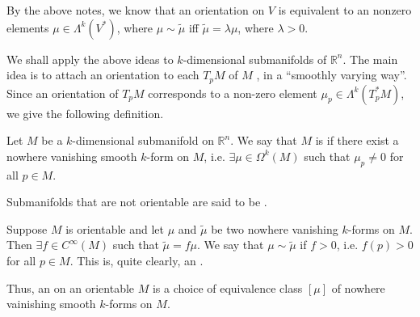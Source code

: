 \documentclass[notoc,notitlepage]{tufte-book}
\begin{document}
By the above notes, we know that an orientation on $V$ is equivalent to an
nonzero elements $\mu \in \Lambda^k(V^*)$, where $\mu \sim \tilde{\mu}$ iff
$\tilde{\mu} = \lambda \mu$, where $\lambda > 0$.

We shall apply the above ideas to $k$-dimensional submanifolds of
$\mathbb{R}^n$. The main idea is to attach an orientation to each
 $T_p M$ of $M$ , in a
``smoothly varying way''. Since an orientation of $T_p M$ corresponds to a
non-zero element $\mu_p \in \Lambda^k(T_p^* M)$, we give the following
definition.

\begin{defn}\label{defn:orientable_submanifolds}
  Let $M$ be a $k$-dimensional submanifold on $\mathbb{R}^n$. We say that $M$ is
   if there exist a nowhere vanishing smooth $k$-form on
  $M$, i.e. $\exists \mu \in \Omega^k(M)$ such that $\mu_p \neq 0$ for all $p
  \in M$.

  Submanifolds that are not orientable are said to be .
\end{defn}

\begin{note}
  Suppose $M$ is orientable and let $\mu$ and $\tilde{\mu}$ be two nowhere
  vanishing $k$-forms on $M$. Then $\exists f \in C^\infty(M)$ such that
  $\tilde{\mu} = f \mu$. We say that $\mu \sim \tilde{\mu}$ if $f > 0$, i.e.
  $f(p) > 0$ for all $p \in M$. This is, quite clearly, an .

  Thus, an  on an orientable $M$ is a choice of equivalence
  class $[\mu]$ of nowhere vainishing smooth $k$-forms on $M$.
\end{note}
\end{document}
